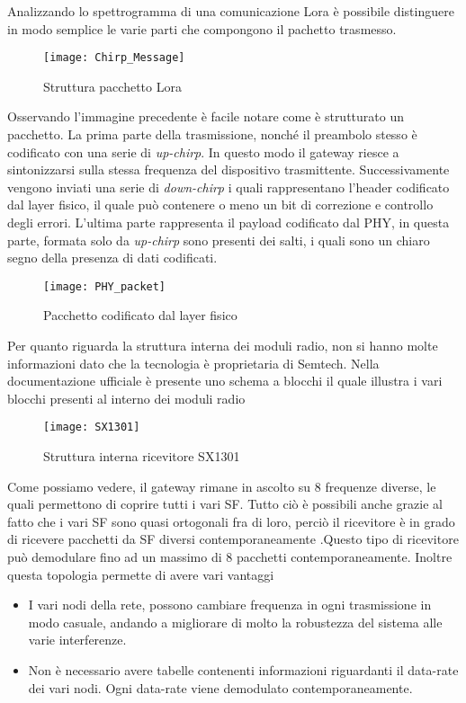 Analizzando lo spettrogramma di una comunicazione Lora è possibile distinguere
in modo semplice le varie parti che compongono il pachetto trasmesso. 

\begin{figure}[h]
\centering 
\texttt{[image: Chirp\_Message]}
\caption{Struttura pacchetto Lora }
\end{figure}

Osservando l'immagine precedente è facile notare come è strutturato un pacchetto.
La prima parte della trasmissione, nonché il preambolo  stesso è codificato con una
serie di \emph{up-chirp}. In questo modo il gateway riesce a sintonizzarsi sulla
stessa frequenza del dispositivo trasmittente.
Successivamente vengono inviati una serie di
\emph{down-chirp} i quali rappresentano l'header codificato dal layer fisico, il
quale può contenere o meno un bit di correzione e controllo degli errori.
L'ultima parte rappresenta il payload codificato dal PHY, in questa parte,
formata solo da \emph{up-chirp} sono presenti dei salti, i quali sono un chiaro
segno della presenza di dati codificati.

\begin{figure}[h]
\centering 
\texttt{[image: PHY\_packet]}
\caption{Pacchetto codificato dal layer fisico}
\end{figure}


Per quanto riguarda la struttura interna dei moduli radio, non si hanno molte
informazioni dato che la tecnologia è proprietaria di Semtech. Nella
documentazione ufficiale è presente uno schema a blocchi il quale illustra i
vari blocchi presenti al interno dei moduli radio
\begin{figure}[h]
\centering 
\texttt{[image: SX1301]}
\caption{Struttura interna ricevitore SX1301}
\end{figure}
Come possiamo vedere, il gateway rimane in ascolto su 8 frequenze diverse, le
quali permettono di coprire tutti i vari SF. Tutto ciò è possibili anche grazie
al fatto che i vari SF sono quasi ortogonali fra di loro, perciò il ricevitore è
in grado di ricevere pacchetti da SF diversi contemporaneamente .Questo tipo di ricevitore può
demodulare fino ad un massimo di 8 pacchetti contemporaneamente. Inoltre questa
topologia permette di avere vari vantaggi
\begin{itemize}
\item I vari nodi della rete, possono cambiare frequenza in ogni trasmissione in
modo casuale, andando a migliorare di molto la robustezza del sistema alle varie
interferenze.
\item Non è necessario avere tabelle contenenti informazioni riguardanti il
data-rate dei vari nodi. Ogni data-rate viene demodulato contemporaneamente.
\end{itemize}
